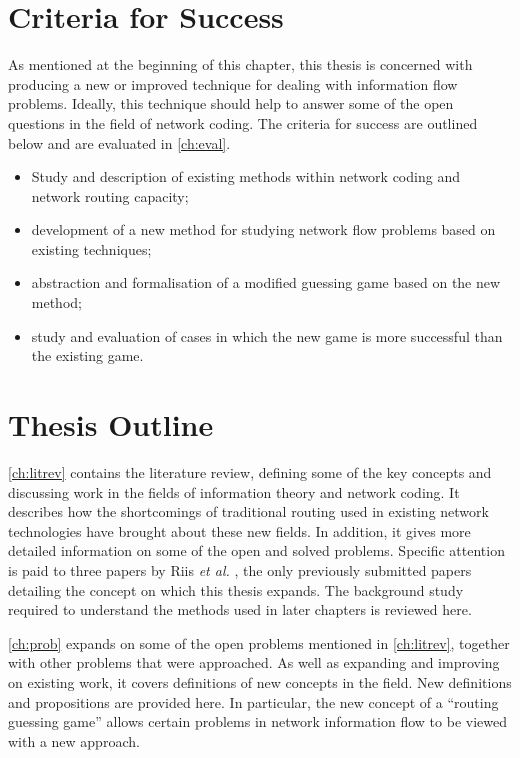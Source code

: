 \section{Criteria for Success}
\label{sect:objective}

As mentioned at the beginning of this chapter, this thesis is concerned with producing a new or improved technique for dealing with information flow problems. Ideally, this technique should help to answer some of the open questions in the field of network coding. The criteria for success are outlined below and are evaluated in \autoref{ch:eval}.

\begin{itemize}
	\item{Study and description of existing methods within network coding and network routing capacity;}
 	\item{development of a new method for studying network flow problems based on existing techniques;}
 	\item{abstraction and formalisation of a modified guessing game based on the new method;}
 	\item{study and evaluation of cases in which the new game is more successful than the existing game.}
\end{itemize}

\section{Thesis Outline}

\autoref{ch:litrev} contains the literature review, defining some of the key concepts and discussing work in the fields of information theory and network coding. It describes how the shortcomings of traditional routing used in existing network technologies have brought about these new fields. In addition, it gives more detailed information on some of the open and solved problems. Specific attention is paid to three papers by Riis \textit{et al.} \cite{riis2005util, riis2005info, came2007}, the only previously submitted papers detailing the concept on which this thesis expands. The background study required to understand the methods used in later chapters is reviewed here.

\autoref{ch:prob} expands on some of the open problems mentioned in \autoref{ch:litrev}, together with other problems that were approached. As well as expanding and improving on existing work, it covers definitions of new concepts in the field. New definitions and propositions are provided here. In particular, the new concept of a ``routing guessing game'' allows certain problems in network information flow to be viewed with a new approach.


